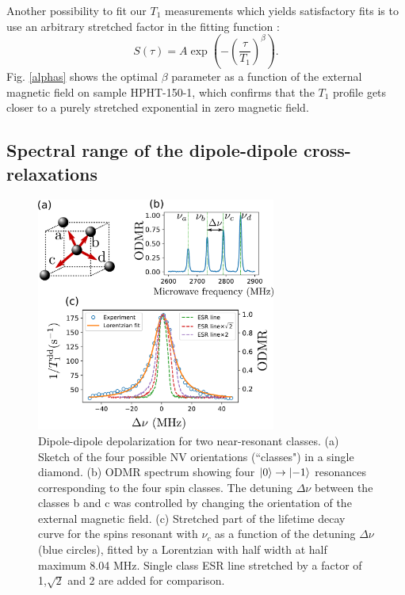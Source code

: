 \documentclass[preprintnumbers,amsmath,amssymb,onecolumn,12pt]{revtex4-2}\usepackage{graphicx}%
\begin{document}
Another possibility to fit our $T_1$ measurements which yields satisfactory fits is to use an arbitrary stretched factor in the fitting function : 
\begin{equation}
S(\tau)=A \exp (-\left(\frac{\tau}{T_1}\right)^\beta ).
\end{equation}
 Fig. \ref{alphas} shows the optimal $\beta$ parameter as a function of the external magnetic field on sample HPHT-150-1, which confirms that the $T_1$ profile gets closer to a purely stretched exponential in zero magnetic field.

\subsection{Spectral range of the dipole-dipole cross-relaxations}
\label{fluctuator width}
\begin{figure}[h]
\includegraphics[width=0.7\textwidth]{Figures_SI/largeur_fluct_SI}
\caption{Dipole-dipole depolarization for two near-resonant classes. (a) Sketch of the four possible NV orientations (``classes") in a single diamond. (b) ODMR spectrum showing four $\ket{0} \to \ket{-1}$ resonances corresponding to the four spin classes. The detuning $\Delta \nu$ between the classes b and c was controlled by changing the orientation of the external magnetic field. (c) Stretched part of the lifetime decay curve for the spins resonant with $\nu_c$ as a function of the detuning $\Delta \nu$ (blue circles), fitted by a Lorentzian with half width at half maximum 8.04 MHz. Single class ESR line stretched by a factor of 1,$\sqrt{2}$ and 2 are added for comparison.}
\label{largeur_fluct}
\end{figure}
\end{document}
